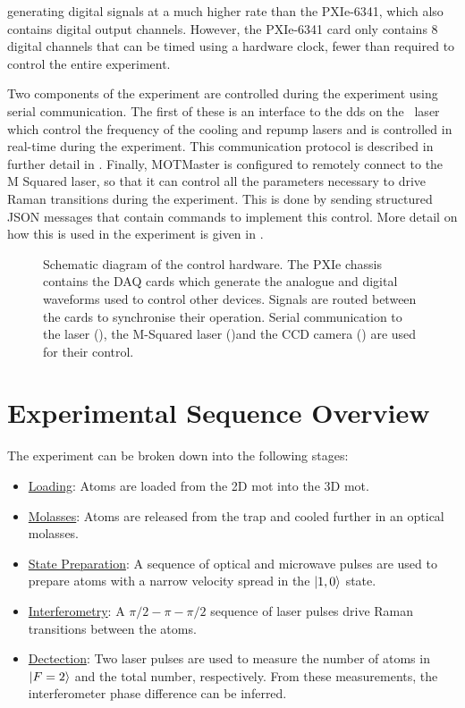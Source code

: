 generating digital signals at a much higher rate than the PXIe-6341, which
also contains digital output channels. However, the PXIe-6341 card only
contains 8 digital channels that can be timed using a hardware clock, fewer
than required to control the entire experiment.
\par\noindent
Two components of the experiment are controlled during the experiment using
serial communication. The first of these is an interface to the \ac{dds} on
the \Muquans\ laser which control the frequency of the cooling and repump
lasers and is controlled in real-time during the experiment. This
communication protocol is described in further detail in
. Finally, MOTMaster is configured to remotely connect to the M
Squared laser, so that it can control all the parameters necessary to drive
Raman transitions during the experiment. This is done by sending structured
JSON messages that contain commands to implement this control. More detail on how this is used in the experiment is given in
.
\begin{figure}
    \centering
    \fontsize{16pt}{14pt}
    \resizebox{1\textwidth}{!}{}
    \caption[Control hardware schematic diagram]{Schematic diagram of the control hardware. The PXIe chassis contains the DAQ cards which generate the analogue and digital waveforms used to control other devices. Signals are routed between the cards to synchronise their operation. Serial communication to the \Muquans laser (), the M-Squared laser ()and the CCD camera () are used for their control.}
    \label{fig:control_hardware}
\end{figure}

\section{Experimental Sequence Overview}
The experiment can be broken down into the following stages:
\begin{itemize}
    \item \underline{Loading}: Atoms are loaded from the 2D \ac{mot} into the 3D \ac{mot}.
    \item \underline{Molasses}: Atoms are released from the trap and cooled further in an optical molasses.
    \item \underline{State Preparation}: A sequence of optical and microwave pulses are used to prepare atoms with a narrow velocity spread in the \(\ket{1,0}\) state.
    \item \underline{Interferometry}: A \(\pi/2 - \pi - \pi/2\) sequence of laser pulses drive Raman transitions between the atoms.
    \item \underline{Dectection}: Two laser pulses are used to measure the number of atoms in \(\ket{F=2}\) and the total number, respectively. From these measurements, the interferometer phase difference can be inferred.
\end{itemize}
